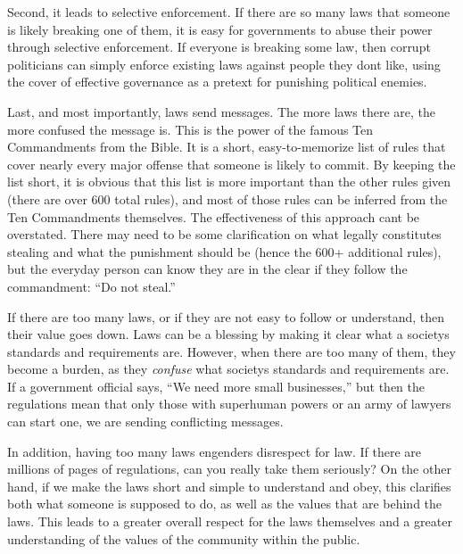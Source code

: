 \documentclass[letterpaper]{article}
\begin{document}
{\color{black}
Second, it leads to selective enforcement. If there are so many laws
that someone is likely breaking one of them, it is easy for governments
to abuse their power through selective enforcement. If everyone is
breaking some law, then corrupt politicians can simply enforce existing
laws against people they don{\textquotesingle}t like,
\textcolor[rgb]{0.32941177,0.5529412,0.83137256}{using} the cover of
effective governance as a pretext for punishing political enemies.}

{\color{black}
Last, and most importantly, laws send messages. The more laws there are,
the more confused the message is. This is the power of the famous Ten
Commandments from the Bible. It is a short, easy-to-memorize list of
rules that cover nearly every major offense that someone is likely to
commit. By keeping the list short, it is obvious that this list is more
important than the other rules given (there are over 600 total rules),
and most of those rules can be inferred from the Ten Commandments
themselves. The effectiveness of this approach can{\textquotesingle}t
be overstated. There may need to be some clarification on what legally
constitutes stealing and what the punishment should be (hence the 600+
additional rules), but the everyday person can know they are in the
clear if they follow the commandment: “Do not steal.”  }

{\color{black}
If there are too many laws, or if they are not easy to follow or
understand, then their value goes down. Laws can be a blessing by
making it clear what a society{\textquotesingle}s standards and
requirements are. However, when there are too many of them, they become
a burden, as they \textit{confuse} what society{\textquotesingle}s
standards and requirements are. If a government official says, “We need
more small businesses,” but then the regulations mean that only those
with superhuman powers or an army of lawyers can start one, we are
sending conflicting messages.}

{\color{black}
In addition, having too many laws engenders disrespect for law. If there
are millions of pages of regulations, can you really take them
seriously?  \textcolor[rgb]{0.32941177,0.5529412,0.83137256}{On the
other hand}, if we make the laws short and simple to understand and
obey, this clarifies both what someone is supposed to do, as well as
the values that are behind
\textcolor[rgb]{0.32941177,0.5529412,0.83137256}{the laws}. This leads
to a greater overall respect for the laws themselves and a greater
understanding of the values of the community within the public.}
\end{document}
